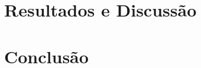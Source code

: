 \documentclass[tcc,baec]{unipampa}
\begin{document}
\chapter{Resultados e Discussão}
\label{cap-resultados-discussao}


\chapter{Conclusão}
\label{cap-conclusao}


%
%












%
%
\end{document}
